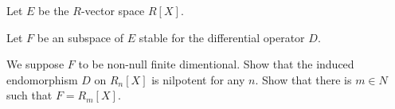 Let $E$ be the $R$-vector space $R[X]$.

Let $F$ be an subspace of $E$ stable for the differential operator $D$.


We suppose $F$ to be non-null finite dimentional. Show that the induced endomorphism $D$ on $R_n[X]$ is nilpotent for any $n$. Show that there is $m \in N$ such that $F = R_m[X]$.
